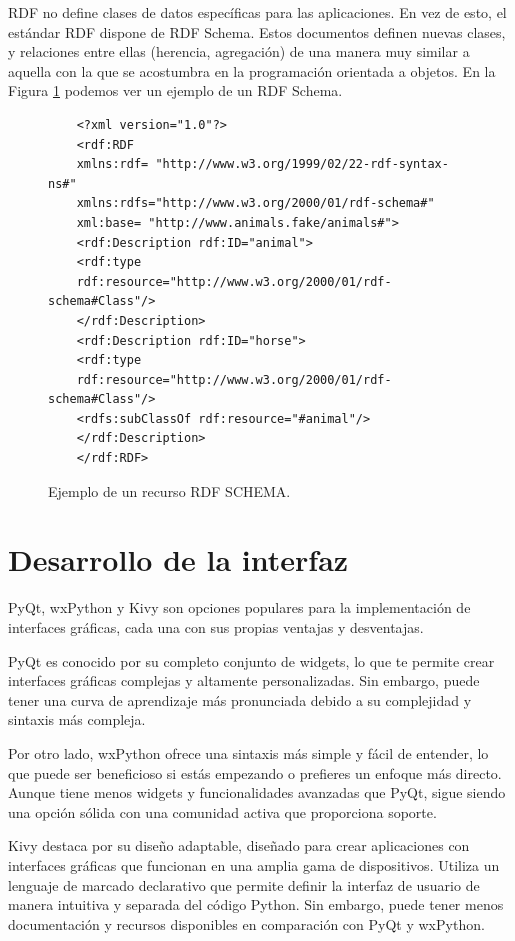RDF no define clases de datos específicas para las aplicaciones. En vez de esto, el estándar RDF dispone de RDF Schema. Estos documentos definen nuevas clases, y relaciones entre ellas (herencia, agregación) de una manera muy similar a aquella con la que se acostumbra en la programación orientada a objetos. En la Figura \ref{fig:ejemploRDF2} podemos ver un ejemplo de un RDF Schema.

\begin{figure}[t]
	\centering
\begin{verbatim}
	<?xml version="1.0"?>
	<rdf:RDF
	xmlns:rdf= "http://www.w3.org/1999/02/22-rdf-syntax-ns#"
	xmlns:rdfs="http://www.w3.org/2000/01/rdf-schema#"
	xml:base= "http://www.animals.fake/animals#">
	<rdf:Description rdf:ID="animal">
	<rdf:type
	rdf:resource="http://www.w3.org/2000/01/rdf-schema#Class"/>
	</rdf:Description>
	<rdf:Description rdf:ID="horse">
	<rdf:type
	rdf:resource="http://www.w3.org/2000/01/rdf-schema#Class"/>
	<rdfs:subClassOf rdf:resource="#animal"/>
	</rdf:Description>
	</rdf:RDF>
\end{verbatim}
	\caption{ Ejemplo de un recurso RDF SCHEMA.}
	\label{fig:ejemploRDF2}
\end{figure}

\section{Desarrollo de la interfaz}

PyQt, wxPython y Kivy son opciones populares para la implementación de interfaces gráficas, cada una con sus propias ventajas y desventajas.

PyQt es conocido por su completo conjunto de widgets, lo que te permite crear interfaces gráficas complejas y altamente personalizadas. Sin embargo, puede tener una curva de aprendizaje más pronunciada debido a su complejidad y sintaxis más compleja.

Por otro lado, wxPython ofrece una sintaxis más simple y fácil de entender, lo que puede ser beneficioso si estás empezando o prefieres un enfoque más directo. Aunque tiene menos widgets y funcionalidades avanzadas que PyQt, sigue siendo una opción sólida con una comunidad activa que proporciona soporte.


Kivy destaca por su diseño adaptable, diseñado para crear aplicaciones con interfaces gráficas que funcionan en una amplia gama de dispositivos. Utiliza un lenguaje de marcado declarativo que permite definir la interfaz de usuario de manera intuitiva y separada del código Python. Sin embargo, puede tener menos documentación y recursos disponibles en comparación con PyQt y wxPython.

